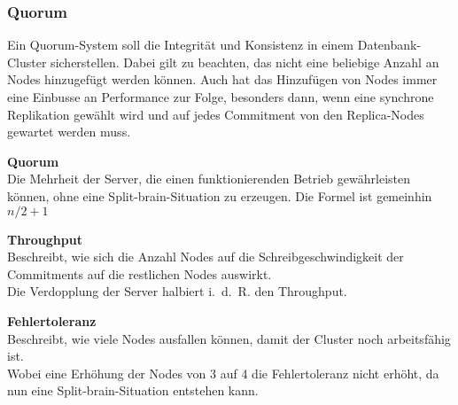 
\subsubsection{Quorum}
\label{subsubsec:quorum}
\begin{flushleft}
    Ein Quorum-System soll die Integrität und Konsistenz in einem Datenbank-Cluster sicherstellen.
    Dabei gilt zu beachten, das nicht eine beliebige Anzahl an Nodes hinzugefügt werden können.
    Auch hat das Hinzufügen von Nodes immer eine Einbusse an Performance zur Folge, besonders dann, wenn eine synchrone Replikation gewählt wird und auf jedes Commitment von den Replica-Nodes gewartet werden muss.

    \begin{description}
        \item \textbf{Quorum}\hfill \\Die Mehrheit der Server, die einen funktionierenden Betrieb gewährleisten können, ohne eine \Gls{Split-brain}-Situation zu erzeugen.
        Die Formel ist gemeinhin \(n/2 + 1\)
        \item \textbf{Throughput}\hfill \\Beschreibt, wie sich die Anzahl Nodes auf die Schreibgeschwindigkeit der Commitments auf die restlichen Nodes auswirkt.\\Die Verdopplung der Server halbiert i. d. R. den Throughput.
        \item \textbf{Fehlertoleranz}\hfill \\Beschreibt, wie viele Nodes ausfallen können, damit der Cluster noch arbeitsfähig ist.\\Wobei eine Erhöhung der Nodes von 3 auf 4 die Fehlertoleranz nicht erhöht, da nun eine \Gls{Split-brain}-Situation entstehen kann.
    \end{description}

\end{flushleft}
